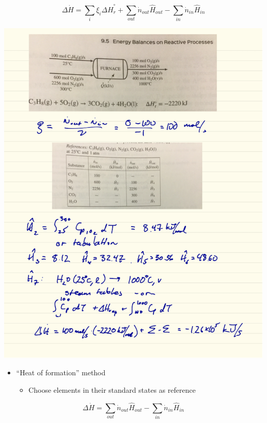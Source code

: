 \documentclass[11pt]{article}
\begin{document}
\[ \Delta \dot{H} = \sum_{i}\xi_{i}\Delta\hat{H}^{\circ}_{r} + \sum_{out}\dot{n}_{out}\hat{H}_{out}-\sum_{in}\dot{n}_{in}\hat{H}_{in} \]

\includegraphics[width=.9\linewidth]{./figs/RxnEnthalpy1.png}

\begin{itemize}
\item ``Heat of formation'' method
\begin{itemize}
\item Choose elements in their standard states as reference
\end{itemize}
\end{itemize}

\[ \Delta \dot{H} = \sum_{out}\dot{n}_{out}\hat{H}_{out}-\sum_{in}\dot{n}_{in}\hat{H}_{in} \]
\end{document}
